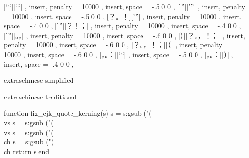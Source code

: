  { [‘“][‘“] }
  {
    {} ,
    { insert, penalty = 10000 },
    { insert, space = -.5 0 0 },
    {}
  }
 { [’”][’”] }
  {
    {},
    { insert, penalty = 10000 },
    { insert, space = -.5 0 0 },
    {}
  }
 { [？。！][’”] }
  {
    {},
    { insert, penalty = 10000 },
    { insert, space = -.4 0 0 },
    {}
  }
 { [’”][？！；] }
  {
    {},
    { insert, penalty = 10000 },
    { insert, space = -.4 0 0 },
    {}
  }
 { [’”][。，] }
  {
    {},
    { insert, penalty = 10000 },
    { insert, space = -.6 0 0 },
    {}
  }
 { [）][？。，！；] }
  {
    {},
    { insert, penalty = 10000 },
    { insert, space = -.6 0 0 },
    {}
  }
 { [？。，！；][（] }
  {
    {},
    { insert, penalty = 10000 },
    { insert, space = -.6 0 0 },
    {}
  }
 { [，。：][‘“] }
  {
    {},
    { insert, space = -.5 0 0 },
    {}
  }
 { [，。：][）] }
  {
    {},
    { insert, space = -.4 0 0 },
    {}
  }

\expandafter\addto\csname extraschinese-simplified\endcsname{\onehalfspacing}

\expandafter\addto\csname extraschinese-traditional\endcsname{\onehalfspacing}

\RequirePackage{luacode}

\begin{luacode}
function fix_cjk_quote_kerning(s)
  s = s:gsub ("(\\vs%
  s = s:gsub ("(\\vs%
  s = s:gsub ("(\\ch%
  s = s:gsub ("(\\ch%
  return s
end
\end{luacode}

\newcommand{\FOCUSAdlCJKQuoteKerningOn}{%
  \directlua{%
    luatexbase.add_to_callback(
      "process_input_buffer", fix_cjk_quote_kerning, "fix_cjk_quote_kerning")}}
\newcommand{\FOCUSAdlCJKQuoteKerningOff}{%
  \directlua{%
    luatexbase.remove_from_callback(
      "process_input_buffer", "fix_cjk_quote_kerning")}}


